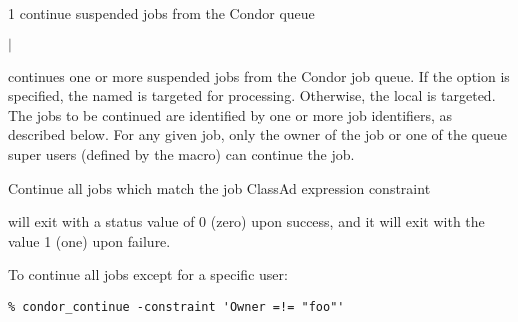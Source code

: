 \begin{ManPage}{\label{man-condor-continue}}{1}
{continue suspended jobs from the Condor queue}
\Synopsis {}
\ToolArgsBase

\ToolDebugOption
\ToolLocate
\ToolJobs
$|$  \Dots

\ToolDebugOption
\ToolLocate
\ToolAll


\Description

 continues one or more suspended jobs from the Condor job queue.  
If the  option is specified, the named  is targeted
for processing.  
Otherwise, the local  is targeted.
The jobs to be continued are identified by one or more job identifiers, as
described below.
For any given job, only the owner of the job or one of the queue super users
(defined by the  macro) can continue the job.

\begin{Options}
	\ToolArgsBaseDesc
	\ToolLocateDesc
    \ToolDebugDesc
	 {Continue all jobs which match
	                the job ClassAd expression constraint}
\end{Options}

\ExitStatus

 will exit with a status value of 0 (zero) upon success,
and it will exit with the value 1 (one) upon failure.

\Examples
To continue all jobs except for a specific user:
\footnotesize
\begin{verbatim}
% condor_continue -constraint 'Owner =!= "foo"'
\end{verbatim}
\nocontinuealsize

\end{ManPage}
